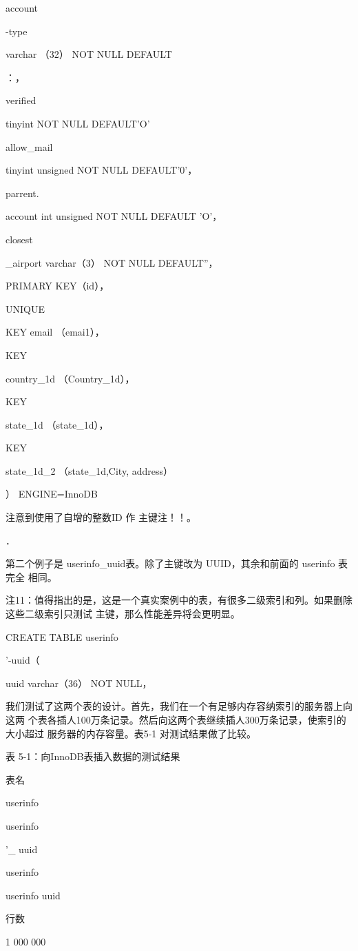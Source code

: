 account

-type

varchar （32） NOT NULL DEFAULT

：，

verified

tinyint NOT NULL DEFAULT'O'

allow\_mail

tinyint unsigned NOT NULL DEFAULT'0'，

parrent.

account int unsigned NOT NULL DEFAULT 'O'，

closest

\_airport varchar（3） NOT NULL DEFAULT''，

PRIMARY KEY（id），

UNIQUE

KEY email （emai1），

KEY

country\_1d （Country\_1d），

KEY

state\_1d （state\_1d），

KEY

state\_1d\_2 （state\_1d,City, address）

） ENGINE=InnoDB

注意到使用了自增的整数ID 作 主键注！！。

．

第二个例子是 userinfo\_uuid表。除了主键改为 UUID，其余和前面的 userinfo 表完全
相同。

注11：值得指出的是，这是一个真实案例中的表，有很多二级索引和列。如果删除这些二级索引只测试
主键，那么性能差异将会更明显。

CREATE TABLE userinfo

'-uuid（

uuid varchar（36） NOT NULL，

我们测试了这两个表的设计。首先，我们在一个有足够内存容纳索引的服务器上向这两
个表各插人100万条记录。然后向这两个表继续插人300万条记录，使索引的大小超过
服务器的内存容量。表5-1 对测试结果做了比较。

表 5-1：向InnoDB表插入数据的测试结果

表名

userinfo

userinfo

'\_ uuid

userinfo

userinfo uuid

行数

1 000 000


